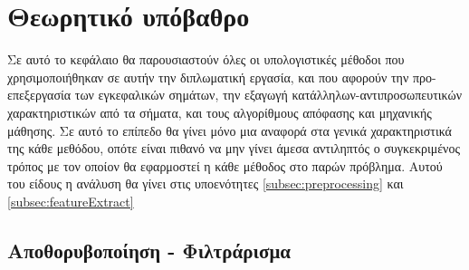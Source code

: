 \documentclass[11pt,a4paper,english,greek,twoside]{../Thesis}
\begin{document}
\chapter{Θεωρητικό υπόβαθρο}\label{chap:Background}
\par Σε αυτό το κεφάλαιο θα παρουσιαστούν όλες οι υπολογιστικές μέθοδοι που χρησιμοποιήθηκαν σε αυτήν την διπλωματική εργασία, και που αφορούν την προ-επεξεργασία των εγκεφαλικών σημάτων, την εξαγωγή κατάλληλων-αντιπροσωπευτικών χαρακτηριστικών από τα σήματα, και τους αλγορίθμους απόφασης και μηχανικής μάθησης. Σε αυτό το επίπεδο θα γίνει μόνο μια αναφορά στα γενικά χαρακτηριστικά της κάθε μεθόδου, οπότε είναι πιθανό να μην γίνει άμεσα αντιληπτός ο συγκεκριμένος τρόπος με τον οποίον θα εφαρμοστεί η κάθε μέθοδος στο παρών πρόβλημα. Αυτού του είδους η ανάλυση θα γίνει στις υποενότητες \ref{subsec:preprocessing} και \ref{subsec:featureExtract}
\section{Αποθορυβοποίηση - Φιλτράρισμα}
\end{document}
